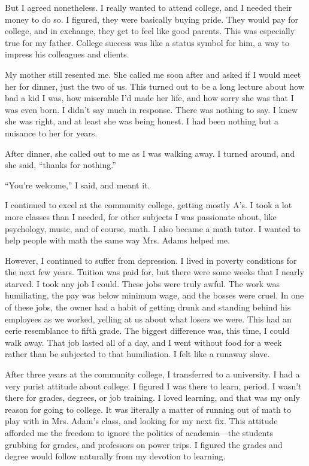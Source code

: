 But I agreed nonetheless. I really wanted to attend college, and I needed their money to do so. I figured, they were basically buying pride. They would pay for college, and in exchange, they get to feel like good parents. This was especially true for my father. College success was like a status symbol for him, a way to impress his colleagues and clients.

My mother still resented me. She called me soon after and asked if I would meet her for dinner, just the two of us. This turned out to be a long lecture about how bad a kid I was, how miserable I'd made her life, and how sorry she was that I was even born. I didn't say much in response. There was nothing to say. I knew she was right, and at least she was being honest. I had been nothing but a nuisance to her for years.

After dinner, she called out to me as I was walking away. I turned around, and she said, ``thanks for nothing.''

``You're welcome,'' I said, and meant it.

I continued to excel at the community college, getting mostly A's. I took a lot more classes than I needed, for other subjects I was passionate about, like psychology, music, and of course, math. I also became a math tutor. I wanted to help people with math the same way Mrs. Adams helped me.

However, I continued to suffer from depression. I lived in poverty conditions for the next few years. Tuition was paid for, but there were some weeks that I nearly starved. I took any job I could. These jobs were truly awful. The work was humiliating, the pay was below minimum wage, and the bosses were cruel. In one of these jobs, the owner had a habit of getting drunk and standing behind his employees as we worked, yelling at us about what losers we were. This had an eerie resemblance to fifth grade. The biggest difference was, this time, I could walk away. That job lasted all of a day, and I went without food for a week rather than be subjected to that humiliation. I felt like a runaway slave.

After three years at the community college, I transferred to a university. I had a very purist attitude about college. I figured I was there to learn, period. I wasn't there for grades, degrees, or job training. I loved learning, and that was my only reason for going to college. It was literally a matter of running out of math to play with in Mrs. Adam's class, and looking for my next fix. This attitude afforded me the freedom to ignore the politics of academia---the students grubbing for grades, and professors on power trips. I figured the grades and degree would follow naturally from my devotion to learning.

